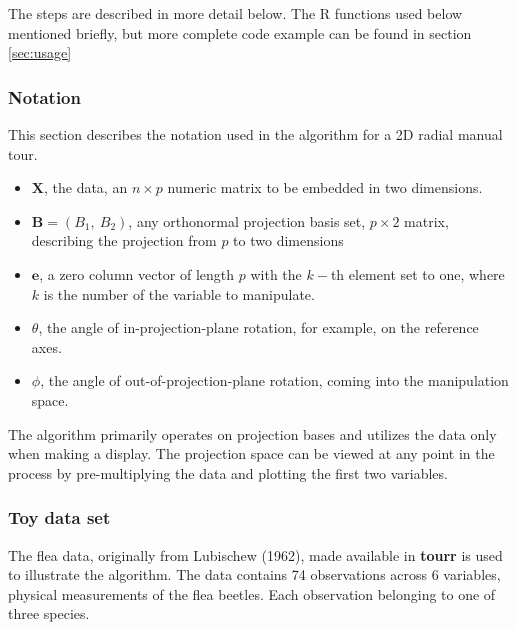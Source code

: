 The steps are described in more detail below. The R functions used below mentioned briefly, but more complete code example can be found in section \ref{sec:usage}

\hypertarget{notation}{%
\subsubsection{Notation}\label{notation}}

This section describes the notation used in the algorithm for a 2D radial manual tour.

\begin{itemize}
  \item $\textbf{X}$, the data, an $n \times p$ numeric matrix to be embedded in two dimensions.
  \item $\textbf{B} = (B_1,~ B_2)$, any orthonormal projection basis set, $p \times 2$ matrix, describing the projection from $p$ to two dimensions
  \item $\textbf{e}$, a zero column vector of length $p$ with the $k-$th element set to one, where $k$ is the number of the variable to manipulate.
  \item $\theta$, the angle of in-projection-plane rotation, for example, on the reference axes.
  \item $\phi$, the angle of out-of-projection-plane rotation, coming into the manipulation space.
\end{itemize}

The algorithm primarily operates on projection bases and utilizes the data only when making a display. The projection space can be viewed at any point in the process by pre-multiplying the data and plotting the first two variables.

\hypertarget{toy-data-set}{%
\subsubsection{Toy data set}\label{toy-data-set}}

The flea data, originally from Lubischew (1962), made available in \textbf{tourr} is used to illustrate the algorithm. The data contains 74 observations across 6 variables, physical measurements of the flea beetles. Each observation belonging to one of three species.

